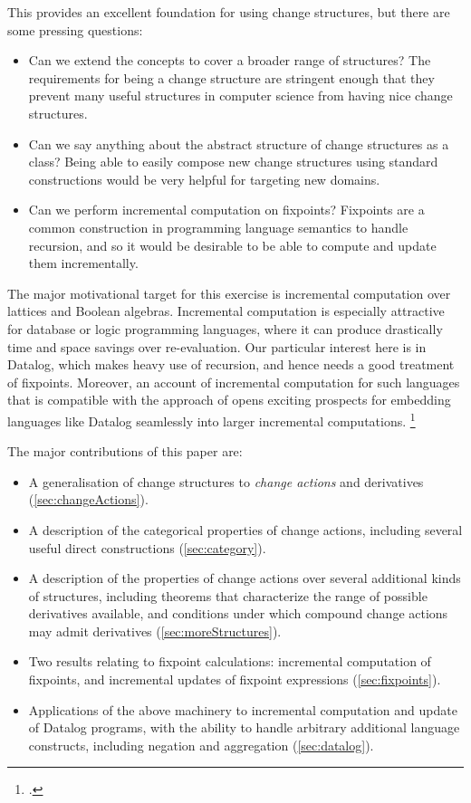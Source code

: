 This provides an excellent foundation for using change structures, but there are
some pressing questions:
\begin{itemize}
  \item Can we extend the concepts to cover a broader range of structures?
    The requirements for being a change structure are stringent enough that they
    prevent many useful structures in computer science from having nice change structures.
  \item Can we say anything about the abstract structure of change structures as
    a class? Being able to easily compose new change structures using standard
    constructions would be very helpful for targeting new domains.
  \item Can we perform incremental computation on fixpoints? Fixpoints are a
    common construction in programming language semantics to handle recursion,
    and so it would be desirable to be able to compute and update them incrementally.
\end{itemize}

The major motivational target for this exercise is incremental computation over
lattices and Boolean algebras. Incremental computation is especially attractive
for database or logic programming languages, where it can
produce drastically time and space savings over re-evaluation. Our particular
interest here is in Datalog, which makes heavy use of recursion, and hence needs
a good treatment of fixpoints. Moreover, an
account of incremental computation for such languages that is compatible with
the approach of \textcite{cai2014changes} opens exciting prospects for embedding
languages like Datalog seamlessly into larger incremental computations.
\footcite[See][]{arntz2016datafun}

The major contributions of this paper are:
\begin{itemize}
  \item A generalisation of change structures to \textit{change actions} and derivatives
    (\cref{sec:changeActions}).
  \item A description of the categorical properties of change actions, including
    several useful direct constructions (\cref{sec:category}).
  \item A description of the properties of change actions over several
    additional kinds of structures, including theorems that characterize the range of
    possible derivatives available, and conditions under which compound change
    actions may admit derivatives (\cref{sec:moreStructures}).
  \item Two results relating to fixpoint calculations: incremental computation
    of fixpoints, and incremental updates of fixpoint expressions (\cref{sec:fixpoints}).
  \item Applications of the above machinery to incremental computation and
    update of Datalog programs, with the ability to handle arbitrary additional
    language constructs, including negation and aggregation (\cref{sec:datalog}).
\end{itemize}

